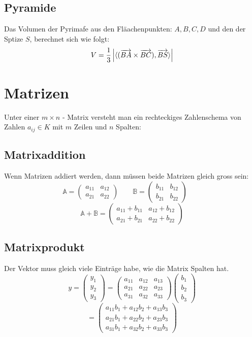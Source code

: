 \documentclass[10pt,a4paper,twocolumn]{article}
\newcommand{\seccol}{black}
\newcommand{\setseccol}[1]{\renewcommand{\seccol}{#1}}
\begin{document}
	\subsection{Pyramide}
	Das Volumen der Pyrimafe aus den Fläachenpunkten: $A,B,C,D$ und den der Sptize $S$, berechnet sich wie folgt:
	$$V=\frac{1}{3}\left| \braket{(\overrightarrow{BA}\times\overrightarrow{BC}),\overrightarrow{BS}}\right|$$
	\setseccol{c3}
	\section{Matrizen}
	Unter einer $m \times n$ - Matrix versteht man ein rechteckiges
	Zahlenschema von Zahlen $a_{ij} \in K$ mit $m$ Zeilen und $n$ Spalten:
	\subsection{Matrixaddition}
	Wenn Matrizen addiert werden, dann müssen beide Matrizen gleich gross sein:
	$$
	\mathbb{A}=
	\begin{pmatrix}
		a_{11} & a_{12} \\
		a_{21} & a_{22}
	\end{pmatrix}
	\qquad
	\mathbb{B}=
	\begin{pmatrix}
		b_{11} & b_{12} \\
		b_{21} & b_{22}
	\end{pmatrix}
	\qquad
	$$
	$$
	\mathbb{A}+\mathbb{B}=
	\begin{pmatrix}
		a_{11}+b_{11} & a_{12}+b_{12} \\
		a_{21}+b_{21} & a_{22}+b_{22}
	\end{pmatrix}
	$$
	
	\subsection{Matrixprodukt}
	Der Vektor muss gleich viele Einträge habe, wie die Matrix Spalten hat.
	$$
	y =
	\begin{pmatrix}
		y_{1} \\
		y_{2} \\
		y_{3}
	\end{pmatrix}
	=
	\begin{pmatrix}
		a_{11} & a_{12} & a_{13} \\
		a_{21} & a_{22} & a_{23} \\
		a_{31} & a_{32} & a_{33}
	\end{pmatrix}
	\begin{pmatrix}
		b_{1} \\
		b_{2} \\
		b_{3}
	\end{pmatrix}
	$$
	$$=
	\begin{pmatrix}
		a_{11}b_1 + a_{12}b_2 + a_{13}b_3 \\
		a_{21}b_1 + a_{22}b_2 + a_{23}b_3 \\
		a_{31}b_1 + a_{32}b_2 + a_{33}b_3
	\end{pmatrix}
	$$
	
\end{document}
